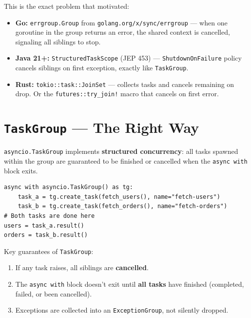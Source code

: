 \documentclass[11pt,a4paper,oneside]{book}
\newcommand{\py}[1]{\texttt{\color{pyblue}#1}}
\newcommand{\gocode}[1]{\texttt{\color{goblue}#1}}
\newcommand{\rustcode}[1]{\texttt{\color{BrickRed}#1}}
\newcommand{\javacode}[1]{\texttt{\color{javaorange!80!black}#1}}
\begin{document}
\begin{analogybox}
This is the exact problem that motivated:
\begin{itemize}
    \item \textcolor{goblue}{\textbf{Go:}} \gocode{errgroup.Group} from \texttt{golang.org/x/sync/errgroup}
          --- when one goroutine in the group returns an error, the shared context is cancelled,
          signaling all siblings to stop.
    \item \textcolor{javaorange}{\textbf{Java 21+:}} \javacode{StructuredTaskScope} (JEP 453) ---
          \texttt{ShutdownOnFailure} policy cancels siblings on first exception, exactly like \py{TaskGroup}.
    \item \textcolor{BrickRed}{\textbf{Rust:}} \rustcode{tokio::task::JoinSet} --- collects
          tasks and cancels remaining on drop. Or the \texttt{futures::try\_join!} macro that
          cancels on first error.
\end{itemize}
\end{analogybox}

\section{\py{TaskGroup} --- The Right Way}

\py{asyncio.TaskGroup} implements \textbf{structured concurrency}: all tasks spawned within the
group are guaranteed to be finished or cancelled when the \py{async with} block exits.

\begin{lstlisting}[style=python]
async with asyncio.TaskGroup() as tg:
    task_a = tg.create_task(fetch_users(), name="fetch-users")
    task_b = tg.create_task(fetch_orders(), name="fetch-orders")
# Both tasks are done here
users = task_a.result()
orders = task_b.result()
\end{lstlisting}

\begin{successbox}
Key guarantees of \py{TaskGroup}:
\begin{enumerate}
    \item If any task raises, all siblings are \textbf{cancelled}.
    \item The \py{async with} block doesn't exit until \textbf{all tasks} have finished (completed,
          failed, or been cancelled).
    \item Exceptions are collected into an \py{ExceptionGroup}, not silently dropped.
\end{enumerate}
\end{successbox}
\end{document}
